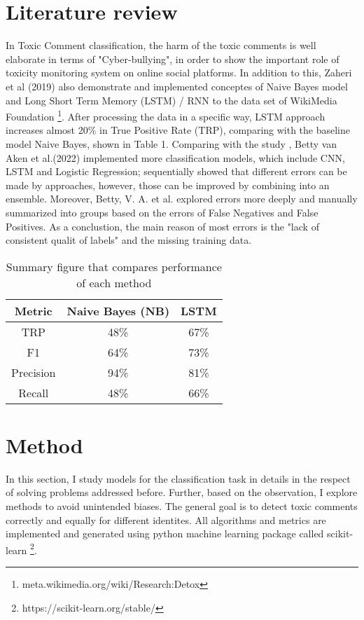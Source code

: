 \documentclass[11pt,twocolumn]{article}
\begin{document}
\section{Literature review}
In Toxic Comment classification\cite{ravi2019toxic}, the harm of the toxic comments is well elaborate in terms of "Cyber-bullying", in order to show the important role of toxicity monitoring system on online social platforms.
In addition to this, Zaheri et al (2019)\cite{ravi2019toxic} also demonstrate and implemented conceptes of Naive Bayes model and Long Short Term Memory (LSTM) / RNN to the data set of WikiMedia Foundation \footnote{meta.wikimedia.org/wiki/Research:Detox}. After processing the data in a specific way,
LSTM approach increases almost 20\% in True Positive Rate (TRP), comparing with the baseline model Naive Bayes, shown in Table 1. 
\bigbreak
Comparing with the study \cite{ravi2019toxic} , Betty van Aken et al.(2022) \cite{van2018challenges} implemented more classification models, which include CNN, LSTM and Logistic Regression; sequentially showed that different errors can be made by approaches, however, those can be improved by combining into an ensemble.
Moreover, Betty, V. A. et al. explored errors more deeply and manually summarized into groups based on the errors of False Negatives and False Positives. As a conclustion, the main reason of most errors is the "lack of consistent qualit of labels" and the missing training data.
\begin{table}[h]
      \begin{center}
      \begin{tabular}{|c c c|}
           
                 \hline
                 \textbf{Metric} & \textbf{Naive Bayes (NB)} & \textbf{LSTM}\\
                 \hline%
                 TRP         & 48\% & 67\%\\
                 F1          & 64\% & 73\%\\
                 Precision   & 94\% & 81\%\\
                 Recall      & 48\% & 66\%\\
                 \hline
           
      \end{tabular}
      \caption{Summary figure that compares performance of each method}\label{table1}
      \end{center}
      \end{table}

\section{Method}
In this section, I study models for the classification task in details in the respect of solving problems addressed before. Further, based on the observation, I explore methods to avoid unintended biases. The general goal is to detect toxic comments correctly and equally for different identites.
All algorithms and metrics are implemented and generated using python machine learning package called scikit-learn \footnote{https://scikit-learn.org/stable/}.
\end{document}
